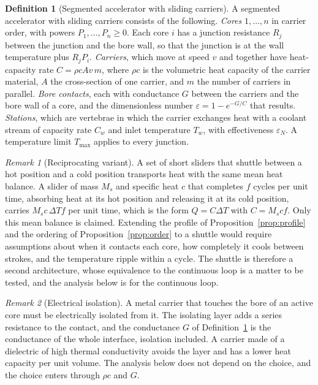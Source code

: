 \documentclass[11pt]{article}
\theoremstyle{definition}
\newtheorem{definition}{Definition}[section]
\theoremstyle{plain}
\theoremstyle{remark}
\newtheorem{remark}{Remark}[section]
\begin{document}
\begin{definition}[Segmented accelerator with sliding carriers]\label{def:seg}
A segmented accelerator with sliding carriers consists of the following.
\emph{Cores} $1,\dots,n$ in carrier order, with powers $P_1,\dots,P_n\ge 0$. Each core $i$ has a junction resistance $R_j$ between the junction and the bore wall, so that the junction is at the wall temperature plus $R_jP_i$.
\emph{Carriers}, which move at speed $v$ and together have heat-capacity rate $C=\rho c A v\, m$, where $\rho c$ is the volumetric heat capacity of the carrier material, $A$ the cross-section of one carrier, and $m$ the number of carriers in parallel.
\emph{Bore contacts}, each with conductance $G$ between the carriers and the bore wall of a core, and the dimensionless number $\varepsilon=1-e^{-G/C}$ that results.
\emph{Stations}, which are vertebrae in which the carrier exchanges heat with a coolant stream of capacity rate $C_w$ and inlet temperature $T_w$, with effectiveness $\varepsilon_N$.
A temperature limit $T_{\max}$ applies to every junction.
\end{definition}

\begin{remark}[Reciprocating variant]
A set of short sliders that shuttle between a hot position and a cold position transports heat with the same mean heat balance. A slider of mass $M_s$ and specific heat $c$ that completes $f$ cycles per unit time, absorbing heat at its hot position and releasing it at its cold position, carries $M_s c\,\Delta T f$ per unit time, which is the form $Q=C\Delta T$ with $C=M_s c f$. Only this mean balance is claimed. Extending the profile of Proposition~\ref{prop:profile} and the ordering of Proposition~\ref{prop:order} to a shuttle would require assumptions about when it contacts each core, how completely it cools between strokes, and the temperature ripple within a cycle. The shuttle is therefore a second architecture, whose equivalence to the continuous loop is a matter to be tested, and the analysis below is for the continuous loop.
\end{remark}

\begin{remark}[Electrical isolation]
A metal carrier that touches the bore of an active core must be electrically isolated from it. The isolating layer adds a series resistance to the contact, and the conductance $G$ of Definition~\ref{def:seg} is the conductance of the whole interface, isolation included. A carrier made of a dielectric of high thermal conductivity avoids the layer and has a lower heat capacity per unit volume. The analysis below does not depend on the choice, and the choice enters through $\rho c$ and $G$.
\end{remark}
\end{document}
